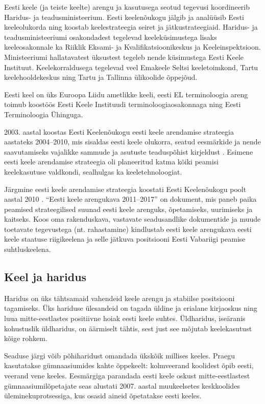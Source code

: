 \begin{multicols}{2}

Eesti keele (ja teiste keelte) arengu ja kasutusega seotud tegevusi koordineerib Haridus- ja teadusministeerium. 
Eesti keelenõukogu jälgib ja analüüsib Eesti keeleolukorda ning koostab keelestrateegia seiret ja jätkustrateegiaid.
Haridus- ja teadusministeeriumi osakondadest tegelevad keeleküsimustega lisaks keeleosakonnale ka Riiklik Eksami- ja Kvalifikatsioonikeskus ja Keeleinspektsioon. 
Ministeeriumi hallatavatest üksustest tegeleb nende küsimustega Eesti Keele Instituut. Keelekorraldusega tegelevad veel Emakeele Seltsi keeletoimkond, Tartu keelehooldekeskus ning Tartu ja Tallinna ülikoolide õppejõud.

Eesti keel on üks Euroopa Liidu ametlikke keeli, eesti EL terminoloogia areng toimub koostöös Eesti Keele Instituudi terminoloogiaosakonnaga ning Eesti Terminoloogia Ühinguga.

2003. aastal koostas Eesti Keelenõukogu eesti keele arendamise
strateegia aastateks 2004--2010, mis sisaldas eesti keele olukorra,
seatud eesmärkide ja nende saavutamiseks vajalikke sammude ja asutuste
teaduspõhist kirjeldust \cite{KeeleStratEst}.  
Esimene eesti keele arendamise strateegia oli planeeritud katma kõiki peamisi keelekasutuse valdkondi, sealhulgas ka keeletehnoloogiat.

Järgmine eesti keele arendamise strateegia koostati Eesti Keelenõukogu poolt aastal 2010 \cite{DevPlan}. 
``Eesti keele arengukava 2011--2017'' on dokument, mis paneb paika
peamised strateegilised suunad eesti keele arenguks, õpetamiseks,
uurimiseks ja kaitseks.   
Koos oma rakenduskava, vastavate seadus\-andlike dokumentide ja muude toetavate tegevustega (nt. rahastamine) kindlustab eesti keele arengukava eesti keele staatuse riigikeelena ja selle jätkuva positsiooni Eesti Vabariigi peamise suhtluskeelena.

\subsection{Keel ja haridus}

Haridus on üks tähtsamaid vahendeid keele arengu ja stabiilse positsiooni tagamiseks. 
Üks hariduse ülesandeid on tagada üldine ja erialane kirjaoskus ning luua mitte-eestlastes positiivne hoiak eesti keele suhtes. 
Üldharidus, iseäranis kohustuslik üldharidus, on äärmiselt tähtis, sest just see mõjutab keelekasutust kõige rohkem.
 
Seaduse järgi võib põhiharidust omandada ükskõik millises keeles. 
Praegu kasutatakse gümnaasiumides kahte õppekeelt: kolmveerand koolidest õpib eesti, veerand vene keeles. 
Eesmärgiga parandada eesti keele oskust mitte-eestlastest gümnaasiumilõpetajate seas alustati 2007. aastal muukeelsetes keskkoolides üleminekuprotsessiga, kus osasid aineid õpetatakse eesti keeles.


\end{multicols}
